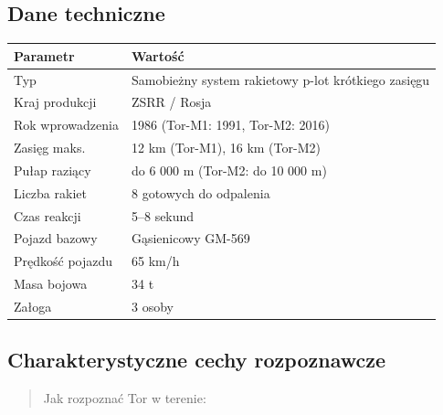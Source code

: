\documentclass[12pt,oneside]{book}
\begin{document}
\subsection{Dane techniczne}\label{dane-techniczne-44}

\begin{longtable}[]{@{}ll@{}}
\toprule\noalign{}
Parametr & Wartość \\
\midrule\noalign{}
\endhead
\bottomrule\noalign{}
\endlastfoot
Typ & Samobieżny system rakietowy p-lot krótkiego zasięgu \\
Kraj produkcji & ZSRR / Rosja \\
Rok wprowadzenia & 1986 (Tor-M1: 1991, Tor-M2: 2016) \\
Zasięg maks. & 12 km (Tor-M1), 16 km (Tor-M2) \\
Pułap raziący & do 6 000 m (Tor-M2: do 10 000 m) \\
Liczba rakiet & 8 gotowych do odpalenia \\
Czas reakcji & 5--8 sekund \\
Pojazd bazowy & Gąsienicowy GM-569 \\
Prędkość pojazdu & 65 km/h \\
Masa bojowa & 34 t \\
Załoga & 3 osoby \\
\end{longtable}

\subsection{Charakterystyczne cechy
rozpoznawcze}\label{charakterystyczne-cechy-rozpoznawcze-44}

\begin{quote}
Jak rozpoznać Tor w terenie:
\end{quote}
\end{document}
